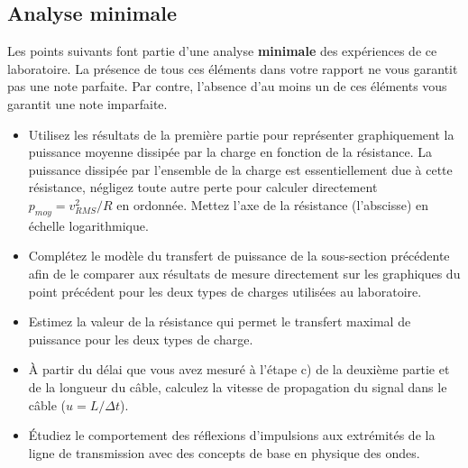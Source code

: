 \documentclass[canadien,12pt,oneside,letterpaper]{article}
\begin{document}
\subsection{Analyse minimale}

Les points suivants font partie d'une analyse \textbf{minimale} des expériences de ce laboratoire. La présence de tous ces éléments dans votre rapport ne vous garantit pas une note parfaite. Par contre, l'absence d'au moins un de ces éléments vous garantit une note imparfaite.

\begin{itemize}
    \item Utilisez les résultats de la première partie pour représenter graphiquement la puissance moyenne dissipée par la charge en fonction de la résistance. La puissance dissipée par l'ensemble de la charge est essentiellement due à cette résistance, négligez toute autre perte pour calculer directement $p_{moy}=v_{RMS}^2/R$ en ordonnée. Mettez l'axe de la résistance (l'abscisse) en échelle logarithmique.
    \item Complétez le modèle du transfert de puissance de la sous-section précédente afin de le comparer aux résultats de mesure directement sur les graphiques du point précédent pour les deux types de charges utilisées au laboratoire.
    \item Estimez la valeur de la résistance qui permet le transfert maximal de puissance pour les deux types de charge.
    \item À partir du délai que vous avez mesuré à l'étape c) de la deuxième partie et de la longueur du câble, calculez la vitesse de propagation du signal dans le câble ($u=L/\Delta t$).
    \item Étudiez le comportement des réflexions d'impulsions aux extrémités de la ligne de transmission avec des concepts de base en physique des ondes.
\end{itemize}
\end{document}
